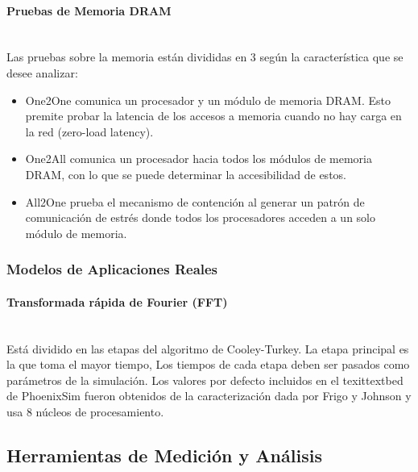 \paragraph{Pruebas de Memoria DRAM}~\\
Las pruebas sobre la memoria están divididas en 3 según la característica que se desee analizar: 
\begin{itemize}
\item One2One comunica un procesador y un módulo de memoria DRAM. Esto premite probar la latencia de los accesos a memoria cuando no hay carga en la red (zero-load latency).
\item One2All comunica un procesador hacia todos los módulos de memoria DRAM, con lo que se puede determinar la accesibilidad de estos.
\item All2One prueba el mecanismo de contención al generar un patrón de comunicación de estrés donde todos los procesadores acceden a un solo módulo de memoria.
\end{itemize} 

\subsubsection{Modelos de Aplicaciones Reales}
\paragraph{Transformada rápida de Fourier (FFT)}~\\

Está dividido en las etapas del algoritmo de Cooley-Turkey. La etapa principal es la que toma el mayor tiempo, 
Los tiempos de cada etapa deben ser pasados como parámetros de la simulación. Los valores por defecto incluidos en el texit{textbed} de PhoenixSim fueron obtenidos de la caracterización  dada por Frigo y Johnson \cite{benchFFT} y usa 8 núcleos de procesamiento. 

\subsection{Herramientas de Medición y Análisis}

